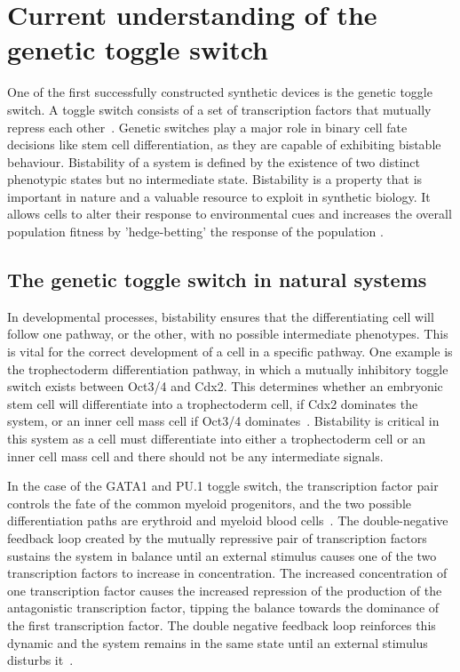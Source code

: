 


\section{Current understanding of the genetic toggle switch}

One of the first successfully constructed synthetic devices is the genetic toggle switch. A toggle switch consists of a set of transcription factors that mutually repress each other~\autocite{Gardner:2000vha}. Genetic switches play a major role in binary cell fate decisions like stem cell differentiation, as they are capable of exhibiting bistable behaviour. Bistability of a system is defined by the existence of two distinct phenotypic states but no intermediate state. Bistability is a property that is important in nature and a valuable resource to exploit in synthetic biology. It allows cells to alter their response to environmental cues and increases the overall population fitness by 'hedge-betting' the response of the population \autocite{Veening:2008da}. 

\subsection{The genetic toggle switch in natural systems}
In developmental processes, bistability ensures that the differentiating cell will follow one pathway, or the other, with no possible intermediate phenotypes. This is vital for the correct development of a cell in a specific pathway. One example is the trophectoderm differentiation pathway, in which a mutually inhibitory toggle switch exists between Oct3/4 and Cdx2. This determines whether an embryonic stem cell will differentiate into a trophectoderm cell, if Cdx2 dominates the system, or an inner cell mass cell if Oct3/4 dominates~\autocite{Niwa:2005fz}. Bistability is critical in this system as a cell must differentiate into either a trophectoderm cell or an inner cell mass cell and there should not be any intermediate signals. 

In the case of the GATA1 and PU.1 toggle switch, the transcription factor pair controls the fate of the common myeloid progenitors, and the two possible differentiation paths are erythroid and myeloid blood cells~\autocite{Liew:2006cd}. The double-negative feedback loop created by the mutually repressive pair of transcription factors sustains the system in balance until an external stimulus causes one of the two transcription factors to increase in concentration. The increased concentration of one transcription factor causes the increased repression of the production of the antagonistic transcription factor, tipping the balance towards the dominance of the first transcription factor. The double negative feedback loop reinforces this dynamic and the system remains in the same state until an external stimulus disturbs it~\autocite{FerrellJr:2002fh}.

